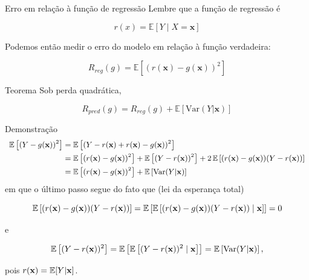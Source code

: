 \documentclass[
  ignorenonframetext,
  aspectratio=169,
]{beamer}
\begin{document}
\begin{frame}
\begin{block}{Erro em relação à função de regressão}
\label{erro-em-relauxe7uxe3o-uxe0-funuxe7uxe3o-de-regressuxe3o}
Lembre que a função de regressão é

\[
r(x) = \mathbb{E}[Y \mid X = \mathbf{x}]
\]

Podemos então medir o erro do modelo em relação à função verdadeira:

\[
R_{reg}(g) = \mathbb{E}[(r(\mathbf{x}) - g(\mathbf{x}))^2]
\]
\end{block}

\begin{block}{Teorema}
\label{teorema}
Sob perda quadrática,

\[
R_{pred}(g) =
R_{reg}(g) +
\mathbb{E}[\mathrm{Var}(Y|\mathbf{x})]
\]
\end{block}
\end{frame}

\begin{frame}
\begin{block}{Demonstração}
\label{demonstrauxe7uxe3o}
\[\small
\begin{aligned}
\mathbb{E}\left[(Y - g(\mathbf{x}))^2\right] &= \mathbb{E}\left[(Y - r(\mathbf{x}) + r(\mathbf{x}) - g(\mathbf{x}))^2\right] \\ &= \mathbb{E}\left[(r(\mathbf{x}) - g(\mathbf{x}))^2\right]+\mathbb{E}\left[(Y - r(\mathbf{x}))^2\right]
+2\,\mathbb{E}\left[(r(\mathbf{x})-g(\mathbf{x}))(Y-r(\mathbf{x}))\right] \\ &=\mathbb{E}\left[(r(\mathbf{x}) - g(\mathbf{x}))^2\right]+\mathbb{E}\left[\mathrm{Var}(Y|\mathbf{x})\right]
\end{aligned}
\] em que o último passo segue do fato que (lei da esperança total)

\[\small
\mathbb{E}\left[(r(\mathbf{x})-g(\mathbf{x}))(Y-r(\mathbf{x}))\right]=\mathbb{E}\left[\mathbb{E}\left[(r(\mathbf{x})-g(\mathbf{x}))(Y-r(\mathbf{x})) \mid \mathbf{x}\right]\right]=0
\]

e

\[\small
\mathbb{E}\left[(Y-r(\mathbf{x}))^2\right]=\mathbb{E}\left[\mathbb{E}\left[(Y-r(\mathbf{x}))^2 \mid \mathbf{x}\right]\right]=\mathbb{E}\left[\mathrm{Var}(Y|\mathbf{x})\right],
\]

pois \(\small r(\mathbf{x}) = \mathbb{E}[Y|\mathbf{x}]\).
\end{block}
\end{frame}
\end{document}
